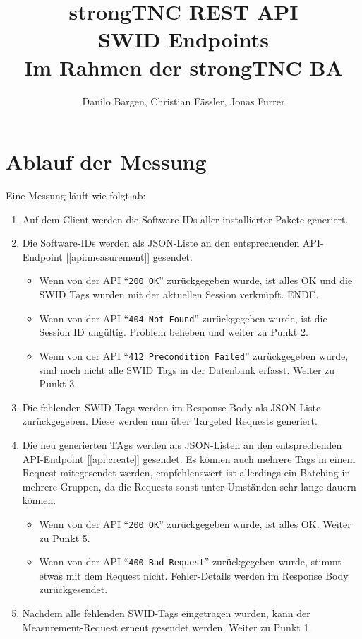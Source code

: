 \documentclass[10pt,a4paper]{scrartcl}
\author{Danilo Bargen, Christian Fässler, Jonas Furrer}
\title{strongTNC REST API\\SWID Endpoints \\ \small{Im Rahmen der strongTNC BA} }
\begin{document}
\begin{titlepage}
	\maketitle
	\vspace{120mm}
	\thispagestyle{empty} %
\end{titlepage}

\newpage
	\tableofcontents
\newpage

\section{Ablauf der Messung}

Eine Messung läuft wie folgt ab:

\begin{enumerate}
	\item Auf dem Client werden die Software-IDs aller installierter Pakete generiert.
	\item Die Software-IDs werden als JSON-Liste an den entsprechenden
		API-Endpoint [\ref{api:measurement}] gesendet.
	\begin{itemize}
		\item Wenn von der API ``\texttt{200 OK}'' zurückgegeben wurde, ist alles OK und die SWID
			Tags wurden mit der aktuellen Session verknüpft. ENDE.
		\item Wenn von der API ``\texttt{404 Not Found}'' zurückgegeben wurde, ist
			die Session ID ungültig. Problem beheben und weiter zu Punkt 2.
		\item Wenn von der API ``\texttt{412 Precondition Failed}'' zurückgegeben wurde, sind
			noch nicht alle SWID Tags in der Datenbank erfasst. Weiter zu Punkt 3.
	\end{itemize}
	\item Die fehlenden SWID-Tags werden im Response-Body als JSON-Liste
		zurückgegeben. Diese werden nun über Targeted Requests generiert.
	\item Die neu generierten TAgs werden als JSON-Listen an den entsprechenden
		API-Endpoint [\ref{api:create}] gesendet. Es können auch mehrere Tags in
		einem Request mitegesendet werden, empfehlenswert ist allerdings ein
		Batching in mehrere Gruppen, da die Requests sonst unter Umständen sehr
		lange dauern können.
	\begin{itemize}
		\item Wenn von der API ``\texttt{200 OK}'' zurückgegeben wurde, ist alles
			OK. Weiter zu Punkt 5.
		\item Wenn von der API ``\texttt{400 Bad Request}'' zurückgegeben wurde,
			stimmt etwas mit dem Request nicht. Fehler-Details werden im Response Body
			zurückgesendet.
	\end{itemize}
	\item Nachdem alle fehlenden SWID-Tags eingetragen wurden, kann der
		Measurement-Request erneut gesendet werden. Weiter zu Punkt 1.
\end{enumerate}
\end{document}
